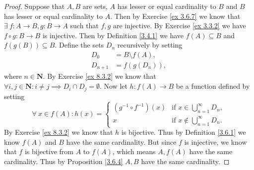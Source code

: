 \begin{proof}
    Suppose that \(A, B\) are sets, \(A\) has lesser or equal cardinality to \(B\) and \(B\) has lesser or equal cardinality to \(A\).
    Then by Exercise \ref{ex 3.6.7} we know that \(\exists\ f : A \to B, g : B \to A\) such that \(f, g\) are injective.
    By Exercise \ref{ex 3.3.2} we have \(f \circ g : B \to B\) is injective.
    Then by Definition \ref{3.4.1} we have \(f(A) \subseteq B\) and \(f(g(B)) \subseteq B\).
    Define the sets \(D_n\) recursively by setting
    \begin{align*}
        D_0       & = B \setminus f(A), \\
        D_{n + 1} & = f(g(D_n)),
    \end{align*}
    where \(n \in \mathbf{N}\).
    By Exercise \ref{ex 8.3.2} we know that \(\forall i, j \in \mathbf{N} : i \neq j \implies D_i \cap D_j = \emptyset\).
    Now let \(h : f(A) \to B\) be a function defined by setting
    \[
        \forall\ x \in f(A) : h(x) = \begin{cases}
            (g^{-1} \circ f^{-1})(x) & \text{if } x \in \bigcup_{n = 1}^\infty D_n,    \\
            x                        & \text{if } x \notin \bigcup_{n = 1}^\infty D_n.
        \end{cases}
    \]
    By Exercise \ref{ex 8.3.2} we know that \(h\) is bijective.
    Thus by Definition \ref{3.6.1} we know \(f(A)\) and \(B\) have the same cardinality.
    But since \(f\) is injective, we know that \(f\) is bijective from \(A\) to \(f(A)\), which means \(A, f(A)\) have the same cardinality.
    Thus by Proposition \ref{3.6.4} \(A, B\) have the same cardinality.
\end{proof}